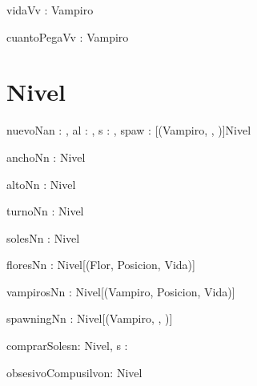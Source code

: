 \documentclass[spanish,a4paper]{article}
\begin{document}
\begin{problema}{vidaV}{v : Vampiro}{\ent}
\end{problema}

\begin{problema}{cuantoPegaV}{v : Vampiro}{\ent}
\end{problema}


\section{Nivel}


\begin{problema}{nuevoN}{an : \ent, al : \ent, s : \ent, spaw : [(Vampiro, \ent, \ent)]}{Nivel}
\end{problema}

\begin{problema}{anchoN}{n : Nivel}{\ent}
\end{problema}

\begin{problema}{altoN}{n : Nivel}{\ent}
\end{problema}


\begin{problema}{turnoN}{n : Nivel}{\ent}
\end{problema}

\begin{problema}{solesN}{n : Nivel}{\ent}
\end{problema}

\begin{problema}{floresN}{n : Nivel}{[(Flor, Posicion, Vida)]}
\end{problema}

\begin{problema}{vampirosN}{n : Nivel}{[(Vampiro, Posicion, Vida)]}
\end{problema}

\begin{problema}{spawningN}{n : Nivel}{[(Vampiro, \ent, \ent)]}
\end{problema}

\begin{problema}{comprarSoles}{n: Nivel, s : \ent}{}
\end{problema}

\begin{problema}{obsesivoCompusilvo}{n: Nivel}{\bool}
\end{problema}
\end{document}
